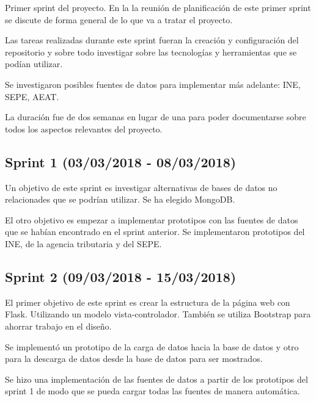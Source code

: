 Primer sprint del proyecto. En la la reunión de planificación de este primer sprint se discute de forma general de lo que va a tratar el proyecto. 

Las tareas realizadas durante este sprint fueran la creación y configuración del repositorio y sobre todo investigar sobre las tecnologías y herramientas que se podían utilizar.

Se investigaron posibles fuentes de datos para implementar más adelante: INE, SEPE, AEAT.

La duración fue de dos semanas en lugar de una para poder documentarse sobre todos los aspectos relevantes del proyecto.



\subsection{Sprint 1 (03/03/2018 - 08/03/2018)}

Un objetivo de este sprint es investigar alternativas de bases de datos no relacionades que se podrían utilizar. Se ha elegido MongoDB.

El otro objetivo es empezar a implementar prototipos con las fuentes de datos que se habían encontrado en el sprint anterior. Se implementaron prototipos del INE, de la agencia tributaria y del SEPE.



\subsection{Sprint 2 (09/03/2018 - 15/03/2018)}

El primer objetivo de este sprint es crear la estructura de la página web con Flask. Utilizando un modelo vista-controlador. También se utiliza Bootstrap para ahorrar trabajo en el diseño.

Se implementó un prototipo de la carga de datos hacia la base de datos y otro para la descarga de datos desde la base de datos para ser mostrados.

Se hizo una implementación de las fuentes de datos a partir de los prototipos del sprint 1 de modo que se pueda cargar todas las fuentes de manera automática.

